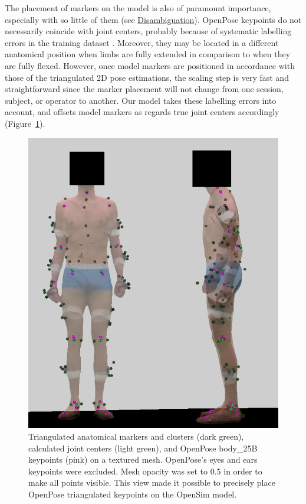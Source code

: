 The placement of markers on the model is also of paramount importance, especially with so little of them (see \hyperlink{Ann:gloss}{Disambiguation}). OpenPose keypoints do not necessarily coincide with joint centers, probably because of systematic labelling errors in the training dataset \cite{Needham2021b}. Moreover, they may be located in a different anatomical position when limbs are fully extended in comparison to when they are fully flexed. However, once model markers are positioned in accordance with those of the triangulated 2D pose estimations, the scaling step is very fast and straightforward since the marker placement will not change from one session, subject, or operator to another. Our model takes these labelling errors into account, and offsets model markers as regards true joint centers accordingly (Figure~\ref{fig_mkmkl}).

\begin{figure}[!ht]
	\centering
	\def\svgwidth{1\columnwidth}
	\fontsize{10pt}{10pt}\selectfont
	\includegraphics[width=.95\linewidth]{"../Chap3/Figures/Fig_MkMkl.png"}
	\caption{Triangulated anatomical markers and clusters (dark green), calculated joint centers (light green), and OpenPose body\_25B keypoints (pink) on a textured mesh. OpenPose’s eyes and ears keypoints were excluded. Mesh opacity was set to 0.5 in order to make all points visible. This view made it possible to precisely place OpenPose triangulated keypoints on the OpenSim model.}
	\label{fig_mkmkl}
\end{figure}

